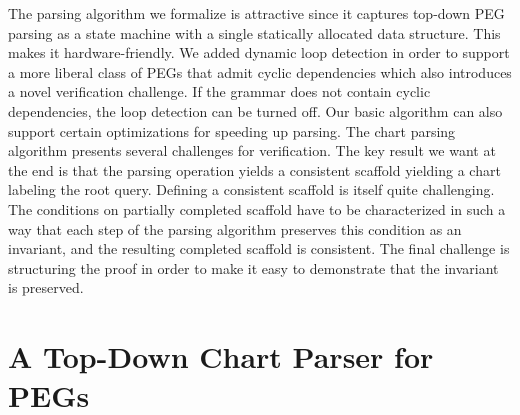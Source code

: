 \documentclass[sigplan,10pt,anonymous,review]{acmart}\settopmatter{printfolios=true,printccs=false,printacmref=false}
\begin{document}
\begin{CCSXML}
The parsing algorithm we formalize is attractive since it captures
top-down PEG parsing as a state machine with a single statically
allocated data structure.  This makes it hardware-friendly.  We added
dynamic loop detection in order to support a more liberal class of 
PEGs that admit cyclic dependencies which also introduces a novel verification
challenge.  If the grammar does not contain cyclic dependencies, the
loop detection can be turned off.  Our basic
algorithm can also support certain optimizations for speeding up parsing.
The chart parsing algorithm presents several challenges for verification.
The key result we want at the end is that the parsing operation
yields a consistent scaffold yielding a chart labeling the root query.  Defining a consistent
scaffold is itself quite challenging.  The conditions on partially
completed scaffold have to be characterized in such a way that each step
of the parsing algorithm preserves this condition as an invariant, and
the resulting completed scaffold is consistent.  The final challenge is
structuring the proof in order to make it easy to demonstrate that the
invariant is preserved.  





\section{A Top-Down Chart Parser for PEGs}


\end{CCSXML}
\end{document}
